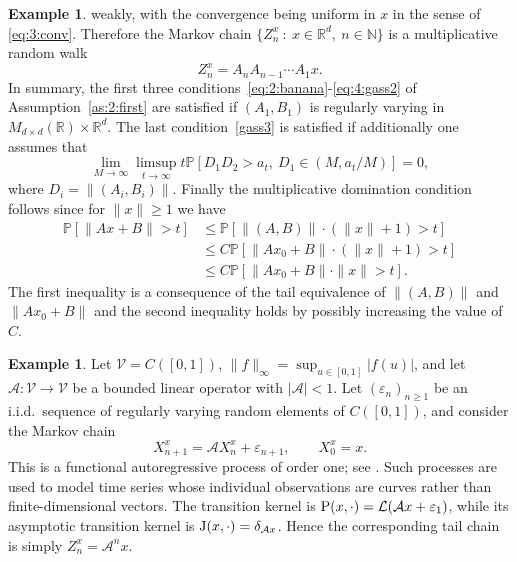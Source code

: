 \documentclass[preprint,12pt]{elsarticle}
\theoremstyle{definition}
\newtheorem{example}[thm]{Example}
\theoremstyle{remark}
\newcommand{\xbf}{{ x}}
\newcommand{\Xbf}{{ X}}
\newcommand{\Zbf}{{ Z}}
\newcommand{\1}{{\mathbf 1}}
\numberwithin{equation}{section}
\newcommand{\Prm}{{\rm P}}
\newcommand{\Krm}{{\rm J}}
\newcommand{\Vcal}{\mathcal{V}}
\begin{document}
\begin{example}
    weakly, with the convergence being uniform in $x$ in the sense 
    of \eqref{eq:3:conv}. Therefore the Markov chain 
    $\{Z_n^x \: : \: x \in \mathbb{R}^d, \: n \in \mathbb{N}\}$ is a multiplicative 
    random walk
    \begin{equation*}
      Z_n^x =  A_n A_{n-1} \cdots A_1 x.
    \end{equation*}
    In summary, the first three conditions~\eqref{eq:2:banana}-\eqref{eq:4:gass2} 
    of Assumption~\ref{as:2:first} are satisfied if $(A_1, B_1)$ is regularly 
    varying in $M_{d\times d}(\mathbb{R}) \times \mathbb{R}^d$.
    The last condition~\eqref{gass3} is satisfied if additionally one assumes that
    \begin{equation*}
      \lim_{M \to \infty} \limsup_{t \to \infty} t 
      \mathbb{P}\left[ D_1 D_2>a_t, \: D_1 \in (M, a_t/M) \right] = 0,
    \end{equation*}
    where $D_i = \|(A_i,B_i)\|$. Finally the multiplicative domination condition 
    follows since for $\|x\|\geq 1$ we have
    \begin{align*}
      \mathbb{P}\left[\|Ax+B\| >t\right] 
        & \leq \mathbb{P}\left[ \|(A,B)\| \cdot (\|x\|+1) >t \right] \\
        & \leq C \mathbb{P}\left[ \|Ax_0+B\| \cdot (\|x\|+1) >t \right] \\
        & \leq C \mathbb{P}\left[ \|Ax_0+B\| \cdot \|x\| >t \right].
    \end{align*}
    The first inequality is a consequence of the tail equivalence of $\|(A, B)\|$ and 
    $\|Ax_0+B\|$ and the second inequality 
    holds by possibly increasing the value of $C$.
  \end{example}

\begin{example}
Let $\Vcal=C([0,1])$, $\|f\|_\infty=\sup_{u\in[0,1]}|f(u)|$,
and let $\mathcal A\colon\Vcal\to\Vcal$ be a bounded linear operator
with $|\mathcal A|<1$. Let
$(\varepsilon_n)_{n\geq1}$ be an i.i.d.\ sequence of regularly varying
random elements of $C([0,1])$, and consider the Markov chain
\begin{equation*}
\Xbf_{n+1}^{\xbf}
=
\mathcal A\Xbf_n^{\xbf}+\varepsilon_{n+1},
\qquad
\Xbf_0^{\xbf}=\xbf.
\end{equation*}
This is a functional autoregressive process of order one; see
\cite{bosq2000linear}. Such processes are used to model time series
whose individual observations are curves rather than finite-dimensional
vectors.
The transition kernel is
$\Prm(\xbf,\cdot)
=
\mathcal L(\mathcal A\xbf+\varepsilon_1)$,
while its asymptotic transition kernel is
$\Krm(\xbf,\cdot)=\delta_{\mathcal A\xbf}$.
Hence the corresponding tail chain is simply
$\Zbf_n^\xbf=\mathcal A^n\xbf$.
\end{example}
\end{document}
